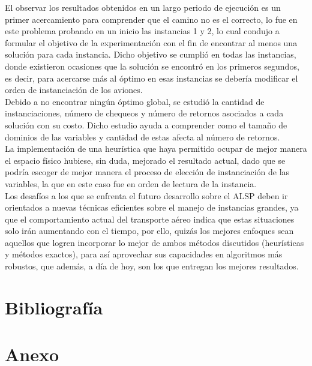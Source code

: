 \documentclass[letter, 10pt]{article}
\begin{document}
El observar los resultados obtenidos en un largo periodo de ejecución es un primer acercamiento para comprender que el camino no es el correcto, lo fue en este problema probando en un inicio las instancias 1 y 2, lo cual condujo a formular el objetivo de la experimentación con el fin de encontrar al menos una solución para cada instancia. Dicho objetivo se cumplió en todas las instancias, donde existieron ocasiones que la solución se encontró en los primeros segundos, es decir, para acercarse más al óptimo en esas instancias se debería modificar el orden de instanciación de los aviones.\\
Debido a no encontrar ningún óptimo global, se estudió la cantidad de instanciaciones, número de chequeos y número de retornos asociados a cada solución con su costo. Dicho estudio ayuda a comprender como el tamaño de dominios de las variables y cantidad de estas afecta al número de retornos.\\
La implementación de una heurística que haya permitido ocupar de mejor manera el espacio físico hubiese, sin duda, mejorado el resultado actual, dado que se podría escoger de mejor manera el proceso de elección de instanciación de las variables, la que en este caso fue en orden de lectura de la instancia.\\

Los desafíos a los que se enfrenta el futuro desarrollo sobre el ALSP deben ir orientados a nuevas técnicas eficientes sobre el manejo de instancias grandes, ya que el comportamiento actual del transporte aéreo indica que estas situaciones solo irán aumentando con el tiempo, por ello, quizás los mejores enfoques sean aquellos que logren incorporar lo mejor de ambos métodos discutidos (heurísticas y métodos exactos), para así aprovechar sus capacidades en algoritmos más robustos, que además, a día de hoy, son los que entregan los mejores resultados.

\newpage

\section{Bibliografía}
    
    
\newpage
\section{Anexo}
\end{document}

